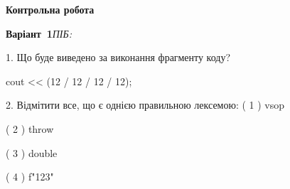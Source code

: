 \documentclass[11pt]{article}
\begin{document}
{\large\textbf{Контрольна робота}}

\textbf{Варіант \No\,1}\hfill \textit{ПІБ:}\,\underline{\hspace{60mm}}
\vspace{4mm}

1. Що буде виведено за виконання фрагменту коду?

cout << (12 / 12 / 12 / 12);


2. %
Відмітити все, що є однією правильною лексемою:
( 1 ) vsop

( 2 ) throw

( 3 ) double

( 4 ) f"123"


\newpage
\end{document}
